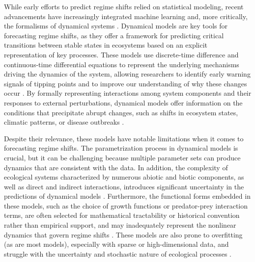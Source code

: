 \documentclass[openacc]{rsproca_new}%
\begin{document}
While early efforts to predict regime shifts relied on statistical modeling, recent advancements have increasingly integrated machine learning and, more critically, the formalisms of dynamical systems \cite{dakos2015resilience, ghadami2022data, PhysRevResearch.6.043194}.
Dynamical models are key tools for forecasting regime shifts, as they offer a framework for predicting critical transitions between stable states in ecosystems based on an explicit representation of key processes. These models use discrete-time difference and continuous-time differential equations to represent the underlying mechanisms driving the dynamics of the system, allowing researchers to identify early warning signals of tipping points and to improve our understanding of why these changes occur \cite{barnosky2012approaching, kefi2014early}. By formally representing interactions among system components and their responses to external perturbations, dynamical models offer information on the conditions that precipitate abrupt changes, such as shifts in ecosystem states, climatic patterns, or disease outbreaks \cite{biggs2015principles, may1977thresholds}.

Despite their relevance, these models have notable limitations when it comes to forecasting regime shifts. The parametrization process in dynamical models is crucial, but it can be challenging because multiple parameter sets can produce dynamics that are consistent with the data. In addition, the complexity of ecological systems characterized by numerous abiotic and biotic components, as well as direct and indirect interactions, introduces significant uncertainty in the predictions of dynamical models \cite{Dietze}. Furthermore, the functional forms embedded in these models, such as the choice of growth functions or predator-prey interaction terms, are often selected for mathematical tractability or historical convention rather than empirical support, and may inadequately represent the nonlinear dynamics that govern regime shifts \cite{clark2001ecological}. These models are also prone to overfitting (as are most models), especially with sparse or high-dimensional data, and struggle with the uncertainty and stochastic nature of ecological processes \cite{turchin2013complex}.
\end{document}
